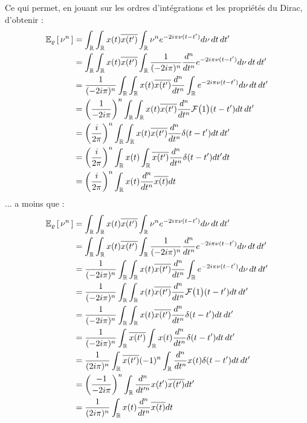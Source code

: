 \begin{proposition}
\begin{demo}
		Ce qui permet, en jouant sur les ordres d'intégrations et les propriétés du Dirac, d'obtenir :
		\begin{align*}
			\esp[\varrho]{\nu^n} &= \int_\R \int_\R x(t) \congu{x(t')} \int_\R \nu^n e^{-2i \pi \nu (t-t')} d\nu\, dt\, dt' \\
			&= \int_\R \int_\R x(t) \congu{x(t')} \int_\R \frac{1}{(-2i \pi)^n}\frac{d^n}{dt^n}e^{-2i \pi \nu(t-t')} d\nu\, dt\, dt' \\
			&= \frac{1}{(-2i \pi)^n} \int_\R \int_\R x(t) \congu{x(t')} \frac{d^n}{dt^n}\int_\R e^{-2i \pi \nu(t-t')} d\nu\, dt\, dt' \\
			&= \left(\frac{1}{-2i \pi}\right)^n \int_\R \int_\R x(t) \congu{x(t')} \frac{d^n}{dt^n}\mathcal{F}\big(1\big)(t-t') dt\, dt' \\
			&= \left(\frac{i}{2 \pi}\right)^n \int_\R \int_\R x(t) \congu{x(t')} \frac{d^n}{dt^n}\delta(t-t') dt\, dt' \\
			&= \left(\frac{i}{2 \pi}\right)^n \int_\R x(t) \int_\R \congu{x(t')} \frac{d^n}{dt^n}\delta(t-t') dt' dt \\
			&= \left(\frac{i}{2 \pi}\right)^n  \int_\R x(t) \frac{d^n}{dt^n}  \congu{x(t)} dt
		\end{align*}
		... a moins que :
		\begin{align*}
			\esp[\varrho]{\nu^n} &= \int_\R \int_\R x(t) \congu{x(t')} \int_\R \nu^n e^{-2i \pi \nu (t-t')} d\nu\, dt\, dt' \\
			&= \int_\R \int_\R x(t) \congu{x(t')} \int_\R \frac{1}{(-2i \pi)^n}\frac{d^n}{dt^n}e^{-2i \pi \nu(t-t')} d\nu\, dt\, dt' \\
			&= \frac{1}{(-2i \pi)^n} \int_\R \int_\R x(t) \congu{x(t')} \frac{d^n}{dt^n}\int_\R e^{-2i \pi \nu(t-t')} d\nu\, dt\, dt' \\
			&= \frac{1}{(-2 i\pi)^n} \int_\R \int_\R x(t) \congu{x(t')} \frac{d^n}{dt^n}\mathcal{F}\big(1\big)(t-t') dt\, dt' \\
			&= \frac{1}{(-2 i\pi)^n} \int_\R \int_\R x(t) \congu{x(t')} \frac{d^n}{dt^n}\delta(t-t') dt\, dt' \\
			&= \frac{1}{(-2 i\pi)^n} \int_\R \congu{x(t')} \int_\R x(t) \frac{d^n}{dt^n}\delta(t-t') dt\, dt' \\
			&= \frac{1}{(2 i\pi)^n} \int_\R \congu{x(t')}(-1)^n\int_\R \frac{d^n}{dt^n}x(t) \delta(t-t') dt\, dt' \\
			&= \left(\frac{-1}{-2i \pi}\right)^n \int_\R \frac{d^n}{dt'^n}x(t') \congu{x(t')}  dt' \\
			&= \frac{1}{(2 i\pi)^n}  \int_\R x(t) \frac{d^n}{dt^n}  \congu{x(t)} dt
		\end{align*}
	\end{demo}
\end{proposition}

